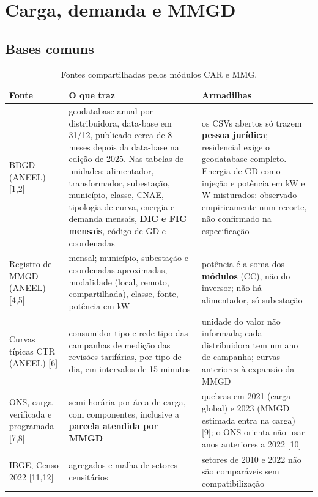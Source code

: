 
\section{Carga, demanda e MMGD}

\subsection*{Bases comuns}

\begin{table}[H]
\centering\small
\caption{Fontes compartilhadas pelos módulos CAR e MMG.}
\begin{tabularx}{\textwidth}{P{3.2cm} L P{4.2cm}}
\toprule
\textbf{Fonte} & \textbf{O que traz} & \textbf{Armadilhas} \\
\midrule
BDGD (ANEEL) [1,2] & geodatabase anual por distribuidora, data-base em 31/12, publicado cerca de 8 meses depois da data-base na edição de 2025. Nas tabelas de unidades: alimentador, transformador, subestação, município, classe, CNAE, tipologia de curva, energia e demanda mensais, \textbf{DIC e FIC mensais}, código de GD e coordenadas & os CSVs abertos só trazem \textbf{pessoa jurídica}; residencial exige o geodatabase completo. Energia de GD como injeção e potência em kW e W misturados: observado empiricamente num recorte, não confirmado na especificação \\
Registro de MMGD (ANEEL) [4,5] & mensal; município, subestação e coordenadas aproximadas, modalidade (local, remoto, compartilhada), classe, fonte, potência em kW & potência é a soma dos \textbf{módulos} (CC), não do inversor; não há alimentador, só subestação \\
Curvas típicas CTR (ANEEL) [6] & consumidor-tipo e rede-tipo das campanhas de medição das revisões tarifárias, por tipo de dia, em intervalos de 15 minutos & unidade do valor não informada; cada distribuidora tem um ano de campanha; curvas anteriores à expansão da MMGD \\
ONS, carga verificada e programada [7,8] & semi-horária por área de carga, com componentes, inclusive a \textbf{parcela atendida por MMGD} & quebras em 2021 (carga global) e 2023 (MMGD estimada entra na carga) [9]; o ONS orienta não usar anos anteriores a 2022 [10] \\
IBGE, Censo 2022 [11,12] & agregados e malha de setores censitários & setores de 2010 e 2022 não são comparáveis sem compatibilização \\

\end{tabularx}
\end{table}
